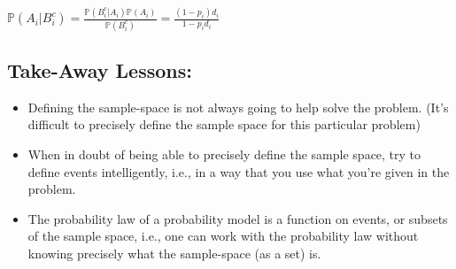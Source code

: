 \documentclass[6008notes.tex]{subfiles}
\begin{document}
{\centering$\mathbb {P}(A_ i | B_ i^ c) = \frac{\mathbb {P}(B_ i^ c | A_ i) \mathbb {P}(A_ i)}{\mathbb {P}(B_ i^ c)} = \frac{(1-p_ i) d_ i}{1 - p_ i d_ i}$ \par}
 
\subsection{Take-Away Lessons:}

\begin{itemize}
\item Defining the sample-space is not always going to help solve the problem. (It's difficult to precisely define the sample space for this particular problem)

\item When in doubt of being able to precisely define the sample space, try to define events intelligently, i.e., in a way that you use what you're given in the problem.

\item The probability law of a probability model is a function on events, or subsets of the sample space, i.e., one can work with the probability law without knowing precisely what the sample-space (as a set) is.
\end{itemize}
\end{document}
